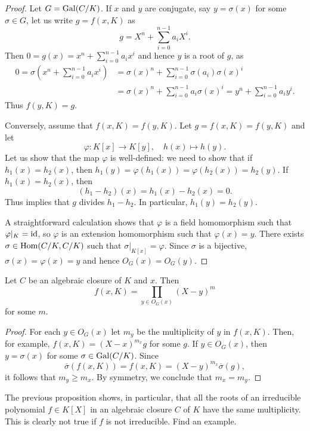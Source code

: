 \begin{proof}
    Let $G=\operatorname{Gal}(C/K)$. 
    If $x$ and $y$ are conjugate, say $y=\sigma(x)$ for some $\sigma\in G$, 
    let us write $g=f(x,K)$ as 
    \[
    g=X^n+\sum_{i=0}^{n-1} a_iX^i. 
    \]
    Then $0=g(x)=x^n+\sum_{i=0}^{n-1}a_ix^i$ and hence $y$ is
    a root of $g$, as 
    \begin{align*}
    0=\sigma\left(x^n+\sum_{i=0}^{n-1}a_ix^i\right)
    &=\sigma(x)^n+\sum_{i=0}^{n-1}\sigma(a_i)\sigma(x)^i\\
    &=\sigma(x)^n+\sum_{i=0}^{n-1}a_i\sigma(x)^i
    =y^n+\sum_{i=0}^{n-1}a_iy^i.
    \end{align*}
    Thus $f(y,K)=g$. 
    
    Conversely, assume that $f(x,K)=f(y,K)$. Let
    $g=f(x,K)=f(y,K)$ and let 
    \[
    \varphi\colon K[x]\to K[y],
    \quad
    h(x)\mapsto h(y).
    \]
    Let us show that the map $\varphi$ is well-defined: we need to show 
    that if 
    $h_1(x)=h_2(x)$, then $h_1(y)=\varphi(h_1(x))=\varphi(h_2(x))=h_2(y)$. 
    If $h_1(x)=h_2(x)$, then 
    \[
    (h_1-h_2)(x)=h_1(x)-h_2(x)=0.
    \]
    Thus implies
    that $g$ divides $h_1-h_2$. In particular, $h_1(y)=h_2(y)$.
    
    A straightforward calculation shows that $\varphi$ is a field 
    homomorphism such that $\varphi|_K=\operatorname{id}$, so $\varphi$ is 
    an extension homomorphism such that $\varphi(x)=y$. There exists
    $\sigma\in\operatorname{Hom}(C/K,C/K)$ such that 
    $\sigma|_{K[x]}=\varphi$. Since $\sigma$ is a bijective, 
    $\sigma(x)=\varphi(x)=y$ and hence 
    $O_G(x)=O_G(y)$. 
\end{proof}

\begin{proposition}
    Let $C$ be an algebraic closure of $K$ and $x$. Then 
    \[
    f(x,K)=\prod_{y\in O_G(x)}(X-y)^m
    \]
    for some $m$. 
\end{proposition}

\begin{proof}
    For each $y\in O_G(x)$ let $m_y$ be the multiplicity
    of $y$ in $f(x,K)$. 
    Then, for example,
    $f(x,K)=(X-x)^{m_x}g$ for some $g$. If $y\in O_G(x)$, 
    then $y=\sigma(x)$ for some $\sigma\in\operatorname{Gal}(C/K)$. Since
    \[
    \overline{\sigma}(f(x,K))=f(x,K)=(X-y)^{m_x}\overline{\sigma}(g), 
    \]
    it follows that $m_y\geq m_x$. By symmetry, 
    we conclude that $m_x=m_y$. 
\end{proof}

The previous proposition shows, in particular, 
that all the roots of 
an irreducible polynomial $f\in K[X]$ 
in an algebraic closure $C$ of $K$
have the same multiplicity. This is clearly 
not true if $f$ is not irreducible. Find an example.

